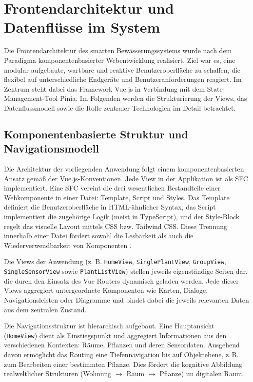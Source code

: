 \section{Frontendarchitektur und Datenflüsse im System}
Die Frontendarchitektur des smarten Bewässerungssystems wurde nach dem Paradigma komponentenbasierter Webentwicklung realisiert. Ziel war es, eine modular aufgebaute, wartbare und reaktive Benutzeroberfläche zu schaffen, die flexibel auf unterschiedliche Endgeräte und Benutzeranforderungen reagiert. Im Zentrum steht dabei das Framework Vue.js in Verbindung mit dem State-Management-Tool Pinia. Im Folgenden werden die Strukturierung der Views, das Datenflussmodell sowie die Rolle zentraler Technologien im Detail betrachtet.

\subsection{Komponentenbasierte Struktur und Navigationsmodell}
Die Architektur der vorliegenden Anwendung folgt einem komponentenbasierten Ansatz gemäß der Vue.js-Konventionen. Jede View in der Applikation ist als \ac{SFC} implementiert. Eine \ac{SFC} vereint die drei wesentlichen Bestandteile einer Webkomponente in einer Datei: Template, Script und Styles. Das Template definiert die Benutzeroberfläche in HTML-ähnlicher Syntax, das Script implementiert die zugehörige Logik (meist in TypeScript), und der Style-Block regelt das visuelle Layout mittels CSS bzw. Tailwind CSS. Diese Trennung innerhalb einer Datei fördert sowohl die Lesbarkeit als auch die Wiederverwendbarkeit von Komponenten \cite{VueGuide2024}.

Die Views der Anwendung (z. B. \texttt{HomeView}, \texttt{SinglePlantView}, 	\texttt{GroupView}, \\ \texttt{SingleSensorView} sowie \texttt{PlantListView}) stellen jeweils eigenständige Seiten dar, die durch den Einsatz des Vue Routers dynamisch geladen werden. Jede dieser Views aggregiert untergeordnete Komponenten wie Karten, Dialoge, Navigationsleisten oder Diagramme und bindet dabei die jeweils relevanten Daten aus dem zentralen Zustand.

Die Navigationsstruktur ist hierarchisch aufgebaut. Eine Hauptansicht (\texttt{HomeView}) dient als Einstiegspunkt und aggregiert Informationen aus den verschiedenen Kontexten: Räume, Pflanzen und deren Sensordaten. Ausgehend davon ermöglicht das Routing eine Tiefennavigation bis auf Objektebene, z.\,B. zum Bearbeiten einer bestimmten Pflanze. Dies fördert die kognitive Abbildung realweltlicher Strukturen (Wohnung $\rightarrow$ Raum $\rightarrow$ Pflanze) im digitalen Raum.
 
